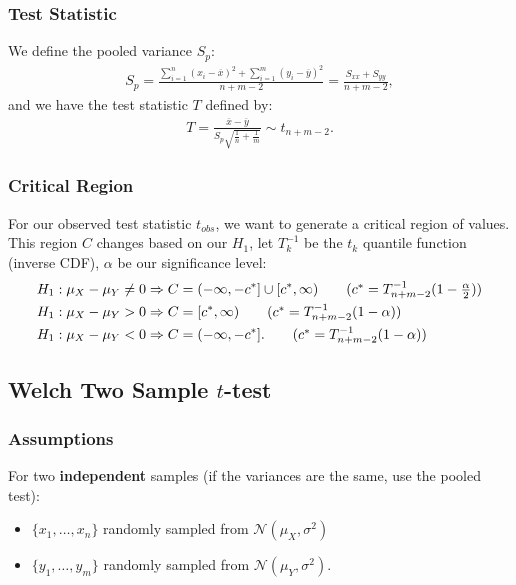 \documentclass[a4paper, 12pt, twoside]{article}
\begin{document}
\subsubsection{Test Statistic}

We define the pooled variance $S_p$:
\begin{align*}
    S_p = \frac{\sum_{i = 1}^n (x_i - \overline{x})^2
        + \sum_{i = 1}^m (y_i - \overline{y})^2}{n + m - 2}
    = \frac{S_{xx} + S_{yy}}{n + m - 2},
\end{align*}
and we have the test statistic $T$ defined by:
\begin{align*}
    T = \frac{\overline{x} - \overline{y}}
    {S_p\sqrt{\frac{1}{n} + \frac{1}{m}}} \sim t_{n + m - 2}.
\end{align*}

\subsubsection{Critical Region}

For our observed test statistic $t_{obs}$, we want to generate a
critical region of values. This region $C$ changes based on our
$H_1$, let $T^{-1}_k$ be the $t_k$ quantile function (inverse CDF),
$\alpha$ be our significance level:
\begin{align*}
    H_1 : \mu_X - \mu_Y \neq 0 & \Rightarrow
    C = (-\infty, -c^*] \cup [c^*, \infty)
    \tag{$ c^* = T^{-1}_{n + m - 2}(1 - \frac{\alpha}{2}) $}         \\
    H_1 : \mu_X - \mu_Y > 0    & \Rightarrow
    C = [c^*, \infty) \tag{$ c^* = T^{-1}_{n + m - 2}(1 - \alpha) $} \\
    H_1 : \mu_X - \mu_Y < 0    & \Rightarrow C = (-\infty, -c^*].
    \tag{$ c^* = T^{-1}_{n + m - 2}(1 - \alpha) $}
\end{align*}

\newpage

\subsection{Welch Two Sample $t$-test}

\subsubsection{Assumptions}

For two \textbf{independent} samples (if the variances are the
same, use the pooled test):
\begin{itemize}
    \item $\{x_1, \ldots, x_n\}$ randomly sampled from
          $\mathcal{N}(\mu_X, \sigma^2)$
    \item $\{y_1, \ldots, y_m\}$
          randomly sampled from $\mathcal{N}(\mu_Y, \sigma^2)$.
\end{itemize}
\end{document}
